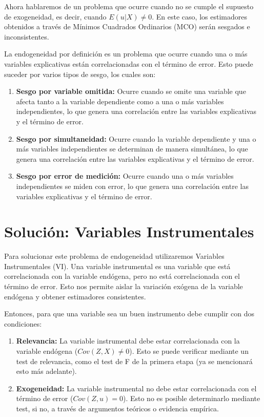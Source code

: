 \documentclass[
]{book}
\providecommand{\tightlist}{%
  \setlength{\itemsep}{0pt}\setlength{\parskip}{0pt}}
\begin{document}
Ahora hablaremos de un problema que ocurre cuando no se cumple el supuesto de exogeneidad, es decir, cuando \(E(u | X) \neq 0\). En este caso, los estimadores obtenidos a través de Mínimos Cuadrados Ordinarios (MCO) serán sesgados e inconsistentes.

La endogeneidad por definición es un problema que ocurre cuando una o más variables explicativas están correlacionadas con el término de error. Esto puede suceder por varios tipos de sesgo, los cuales son:

\begin{enumerate}
\def\labelenumi{\arabic{enumi}.}
\tightlist
\item
  \textbf{Sesgo por variable omitida:} Ocurre cuando se omite una variable que afecta tanto a la variable dependiente como a una o más variables independientes, lo que genera una correlación entre las variables explicativas y el término de error.
\item
  \textbf{Sesgo por simultaneidad:} Ocurre cuando la variable dependiente y una o más variables independientes se determinan de manera simultánea, lo que genera una correlación entre las variables explicativas y el término de error.
\item
  \textbf{Sesgo por error de medición:} Ocurre cuando una o más variables independientes se miden con error, lo que genera una correlación entre las variables explicativas y el término de error.
\end{enumerate}

\section{Solución: Variables Instrumentales}\label{soluciuxf3n-variables-instrumentales}

Para solucionar este problema de endogeneidad utilizaremos Variables Instrumentales (VI). Una variable instrumental es una variable que está correlacionada con la variable endógena, pero no está correlacionada con el término de error. Esto nos permite aislar la variación exógena de la variable endógena y obtener estimadores consistentes.

Entonces, para que una variable sea un buen instrumento debe cumplir con dos condiciones:

\begin{enumerate}
\def\labelenumi{\arabic{enumi}.}
\tightlist
\item
  \textbf{Relevancia:} La variable instrumental debe estar correlacionada con la variable endógena (\(Cov(Z, X) \neq 0\)). Esto se puede verificar mediante un test de relevancia, como el test de F de la primera etapa (ya se mencionará esto más adelante).
\item
  \textbf{Exogeneidad:} La variable instrumental no debe estar correlacionada con el término de error (\(Cov(Z, u) = 0\)). Esto no es posible determinarlo mediante test, si no, a través de argumentos teóricos o evidencia empírica.
\end{enumerate}
\end{document}
